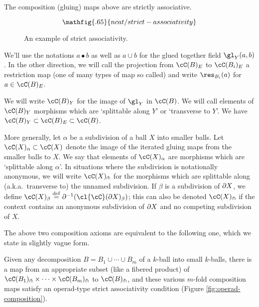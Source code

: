 \begin{axiom} \label{nca-assoc}
The composition (gluing) maps above are strictly associative.
\end{axiom}

\begin{figure}[!ht]
$$\mathfig{.65}{ncat/strict-associativity}$$
\caption{An example of strict associativity.}\label{blah6}\end{figure}

We'll use the notations  $a\bullet b$ as well as $a \cup b$ for the glued together field $\gl_Y(a, b)$.
In the other direction, we will call the projection from $\cC(B)_E$ to $\cC(B_i)_E$ 
a restriction map (one of many types of map so called) and write $\res_{B_i}(a)$ for $a\in \cC(B)_E$.

We will write $\cC(B)_Y$ for the image of $\gl_Y$ in $\cC(B)$.
We will call elements of $\cC(B)_Y$ morphisms which are `splittable along $Y$' or `transverse to $Y$'.
We have $\cC(B)_Y \sub \cC(B)_E \sub \cC(B)$.

More generally, let $\alpha$ be a subdivision of a ball $X$ into smaller balls.
Let $\cC(X)_\alpha \sub \cC(X)$ denote the image of the iterated gluing maps from 
the smaller balls to $X$.
We  say that elements of $\cC(X)_\alpha$ are morphisms which are `splittable along $\alpha$'.
In situations where the subdivision is notationally anonymous, we will write
$\cC(X)\spl$ for the morphisms which are splittable along (a.k.a.\ transverse to)
the unnamed subdivision.
If $\beta$ is a subdivision of $\partial X$, we define $\cC(X)_\beta \deq \bd\inv(\cl{\cC}(\bd X)_\beta)$;
this can also be denoted $\cC(X)\spl$ if the context contains an anonymous
subdivision of $\partial X$ and no competing subdivision of $X$.

The above two composition axioms are equivalent to the following one,
which we state in slightly vague form.

{Given any decomposition $B = B_1\cup\cdots\cup B_m$ of a $k$-ball
into small $k$-balls, there is a 
map from an appropriate subset (like a fibered product) 
of $\cC(B_1)\spl\times\cdots\times\cC(B_m)\spl$ to $\cC(B)\spl$,
and these various $m$-fold composition maps satisfy an
operad-type strict associativity condition (Figure \ref{fig:operad-composition}).}

